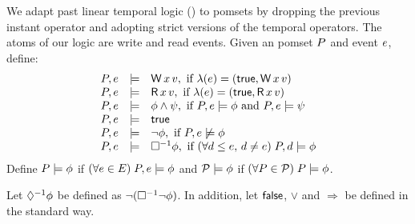 \documentclass[conference]{IEEEtran}
\theoremstyle{plain}
\theoremstyle{definition}
\newtheorem{definition}[theorem]{Definition}
\begin{document}
We adapt past linear temporal logic (\pLTL)
\cite{Lichtenstein:1985:GP:648065.747612} to pomsets by dropping the previous
instant operator and adopting strict versions of the temporal operators.
The atoms of our logic are write and read events.
  Given an pomset $P$ and event $e$, define:
  \begin{displaymath}
    \begin{array}{lrl}
      \aPS,\aEv &\models& \DW{\aLoc}{\aVal}, \text{ if } \labelling(\aEv) =  (\TRUE, \DW{\aLoc}{\aVal}) \\
      \aPS,\aEv &\models& \DR{\aLoc}{\aVal}, \text{ if } \labelling(\aEv) =  (\TRUE, \DR{\aLoc}{\aVal}) \\
      \aPS,\aEv &\models& \afo\land\bfo, \text{ if } \aPS,\aEv \models  \afo \text{ and } \aPS,\aEv \models  \bfo \\
      \aPS,\aEv &\models& \TRUE\\
      \aPS,\aEv &\models& \lnot\afo, \text{ if } \aPS,\aEv \not\models \afo \\
      \aPS,\aEv &\models& \always\afo, \text{ if } (\forall \bEv \le \aEv,\,  \bEv\not=\aEv)\; \aPS,\bEv \models \afo
    \end{array} 
  \end{displaymath}
  Define $P \models \phi$ if
  $(\forall e \in E) \;P,e \models\phi$ and $\mathcal{P}\models \phi$
  if $(\forall P \in \mathcal{P})\; P \models\phi$.

Let $\Diamond^{-1}\phi$ be defined as $\lnot(\Box^{-1}\lnot\phi)$. 
In addition, let $\mathsf{false}$, $\lor$ and $\Rightarrow$ be defined in the
standard way.
\end{document}
